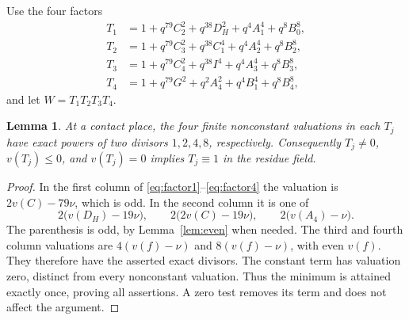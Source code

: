 \documentclass[11pt,a4paper]{article}
\newtheorem{lemma}[theorem]{Lemma}
\theoremstyle{remark}\newtheorem{remark}[theorem]{Remark}
\begin{document}
Use the four factors
\begin{align}
 T_1&=1+q^{79}C_2^2+q^{38}D_H^2+q^4A_1^4+q^8B_0^8,
       \label{eq:factor1}\\
 T_2&=1+q^{79}C_3^2+q^{38}C_1^4+q^4A_2^4+q^8B_2^8,
       \label{eq:factor2}\\
 T_3&=1+q^{79}C_4^2+q^{38}I^4+q^4A_3^4+q^8B_3^8,
       \label{eq:factor3}\\
 T_4&=1+q^{79}G^2+q^2A_4^2+q^4B_1^4+q^8B_4^8,
       \label{eq:factor4}
\end{align}
and let $W=T_1T_2T_3T_4$.

\begin{lemma}\label{lem:classes}
At a contact place, the four finite nonconstant valuations in each
$T_j$ have exact powers of two divisors $1,2,4,8$, respectively.
Consequently $T_j\ne0$, $v(T_j)\le0$, and $v(T_j)=0$ implies
$T_j\equiv1$ in the residue field.
\end{lemma}
\begin{proof}
In the first column of \eqref{eq:factor1}--\eqref{eq:factor4} the
valuation is $2v(C)-79\nu$, which is odd. In the second column it is
one of
\[
 2\bigl(v(D_H)-19\nu\bigr),\qquad
 2\bigl(2v(C)-19\nu\bigr),\qquad
 2\bigl(v(A_4)-\nu\bigr).
\]
The parenthesis is odd, by Lemma~\ref{lem:even} when needed.
The third and fourth column valuations are
$4(v(f)-\nu)$ and $8(v(f)-\nu)$, with even $v(f)$.
They therefore have the asserted exact divisors. The constant term
has valuation zero, distinct from every nonconstant valuation.
Thus the minimum is attained exactly once, proving all assertions.
A zero test removes its term and does not affect the argument.
\end{proof}
\end{document}
